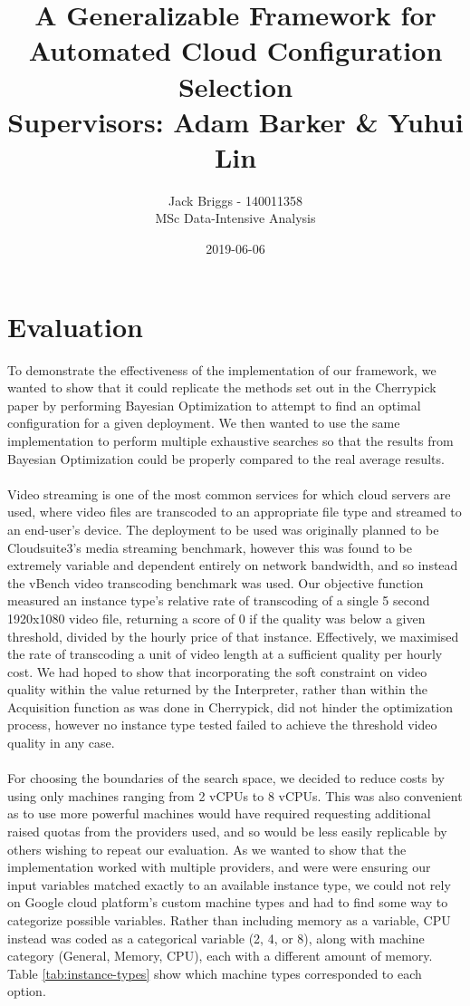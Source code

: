 \documentclass{article}
\title{\vspace{-2.0cm} A Generalizable Framework for Automated Cloud Configuration Selection \\ \vspace{0.5cm} \large Supervisors: Adam Barker \& Yuhui Lin}
\date{2019-06-06}
\author{Jack Briggs - 140011358 \\ MSc Data-Intensive Analysis}
\begin{document}
\section*{Evaluation}
To demonstrate the effectiveness of the implementation of our framework, we wanted to show that it could replicate the methods set out in the Cherrypick paper \cite{Alipourfard2017} by performing Bayesian Optimization to attempt to find an optimal configuration for a given deployment. We then wanted to use the same implementation to perform multiple exhaustive searches so that the results from Bayesian Optimization could be properly compared to the real average results.

\paragraph{}
Video streaming is one of the most common services for which cloud servers are used, where video files are transcoded to an appropriate file type and streamed to an end-user's device\cite{JunXin2005, Lottarini2018}.
The deployment to be used was originally planned to be Cloudsuite3's media streaming benchmark\cite{Palit2016}, however this was found to be extremely variable and dependent entirely on network bandwidth, and so instead the vBench video transcoding benchmark was used\cite{Lottarini2018}. Our objective function measured an instance type's relative rate of transcoding of a single 5 second 1920x1080 video file, returning a score of 0 if the quality was below a given threshold, divided by the hourly price of that instance. Effectively, we maximised the rate of transcoding a unit of video length at a sufficient quality per hourly cost. We had hoped to show that incorporating the soft constraint on video quality within the value returned by the Interpreter, rather than within the Acquisition function as was done in Cherrypick, did not hinder the optimization process, however no instance type tested failed to achieve the threshold video quality in any case.

\paragraph{}
For choosing the boundaries of the search space, we decided to reduce costs by using only machines ranging from 2 vCPUs to 8 vCPUs. This was also convenient as to use more powerful machines would have required requesting additional raised quotas from the providers used, and so would be less easily replicable by others wishing to repeat our evaluation. As we wanted to show that the implementation worked with multiple providers, and were were ensuring our input variables matched exactly to an available instance type, we could not rely on Google cloud platform's custom machine types and had to find some way to categorize possible variables. Rather than including memory as a variable, CPU instead was coded as a categorical variable (2, 4, or 8), along with machine category (General, Memory, CPU), each with a different amount of memory. Table \ref{tab:instance-types} show which machine types corresponded to each option. 
\end{document}

